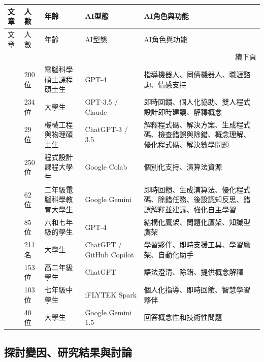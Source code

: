 \begingroup
\small
\setlength{\tabcolsep}{3pt}
\begin{longtable}{@{}p{} p{} p{} p{} p{}@{}}
\toprule
文章 & 人數 & 年齡 & AI型態 & AI角色與功能 \\
\midrule
\endfirsthead
\toprule
文章 & 人數 & 年齡 & AI型態 & AI角色與功能 \\
\midrule
\endhead
\midrule
\multicolumn{5}{r}{續下頁} \\
\endfoot
\bottomrule
\endlastfoot
\cite{cao2023chatbots} & 200位 & 電腦科學碩士課程碩士生 & GPT-4 & 指導機器人、同儕機器人、職涯諮詢、情感支持 \\
\cite{fan2025pair} & 234位 & 大學生 & GPT-3.5 / Claude & 即時回饋、個人化協助、雙人程式設計即時建議、解釋概念 \\
\cite{groothuijsen2024chatbots} & 29位 & 機械工程與物理碩士生 & ChatGPT-3 / 3.5 & 解釋程式碼、解決方案、生成程式碼、檢查錯誤與除錯、概念理解、優化程式碼、解決數學問題 \\
\cite{llerena2024introductory} & 250位 & 程式設計課程大學生 & Google Colab & 個別化支持、演算法資源 \\
\cite{omeh2025pbl} & 62位 & 二年級電腦科學教育大學生 & Google Gemini & 即時回饋、生成演算法、優化程式碼、除錯任務、後設認知反思、錯誤解釋並建議、強化自主學習 \\
\cite{yan2025llm} & 85位 & 六和七年級的學生 & GPT-4 & 結構化鷹架、問題化鷹架、知識型鷹架 \\
\cite{kohen2025integrating} & 211名 & 大學生 & ChatGPT / GitHub Copilot & 學習夥伴、即時支援工具、學習鷹架、自動化助手 \\
\cite{yang2025chatgpt} & 153位 & 高二年級學生 & ChatGPT & 語法澄清、除錯、提供概念解釋 \\
\cite{tang2025enhancing} & 103位 & 七年級中學生 & iFLYTEK Spark & 個人化指導、即時回饋、智慧學習夥伴 \\
\cite{cubillos2025generative} & 40位 & 大學生 & Google Gemini 1.5 & 回答概念性和技術性問題 \\
\end{longtable}
\endgroup

\subsection{探討變因、研究結果與討論}\label{sec:探討變因}

